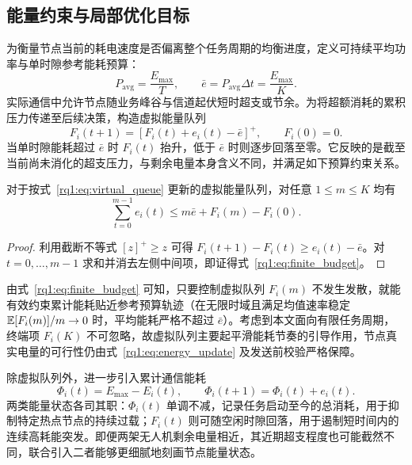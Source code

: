 \subsection{能量约束与局部优化目标}
\label{rq1:sec:lyapunov}

为衡量节点当前的耗电速度是否偏离整个任务周期的均衡进度，定义可持续平均功率与单时隙参考能耗预算：
\begin{equation}
 P_{\mathrm{avg}}=\frac{E_{\max}}{T},\qquad
 \bar e=P_{\mathrm{avg}}\Delta t=\frac{E_{\max}}{K}.
 \label{rq1:eq:average_budget}
\end{equation}
实际通信中允许节点随业务峰谷与信道起伏短时超支或节余。为将超额消耗的累积压力传递至后续决策，构造虚拟能量队列
\begin{equation}
 F_i(t+1)=[F_i(t)+e_i(t)-\bar e]^+,\qquad F_i(0)=0.
 \label{rq1:eq:virtual_queue}
\end{equation}
当单时隙能耗超过 $\bar e$ 时 $F_i(t)$ 抬升，低于 $\bar e$ 时则逐步回落至零。它反映的是截至当前尚未消化的超支压力，与剩余电量本身含义不同，并满足如下预算约束关系。

\begin{proposition}[虚拟队列的累计预算关系]
\label{rq1:prop:budget}
对于按式~\eqref{rq1:eq:virtual_queue} 更新的虚拟能量队列，对任意 $1\le m\le K$ 均有
\begin{equation}
 \sum_{t=0}^{m-1}e_i(t)\le m\bar e+F_i(m)-F_i(0).
 \label{rq1:eq:finite_budget}
\end{equation}
\end{proposition}
\begin{proof}
利用截断不等式 $[z]^+\ge z$ 可得 $F_i(t+1)-F_i(t)\ge e_i(t)-\bar e$。对 $t=0,\ldots,m-1$ 求和并消去左侧中间项，即证得式~\eqref{rq1:eq:finite_budget}。
\end{proof}

由式~\eqref{rq1:eq:finite_budget} 可知，只要控制虚拟队列 $F_i(m)$ 不发生发散，就能有效约束累计能耗贴近参考预算轨迹（在无限时域且满足均值速率稳定 $\mathbb{E}[F_i(m)]/m\to0$ 时，平均能耗严格不超过 $\bar e$）。考虑到本文面向有限任务周期，终端项 $F_i(K)$ 不可忽略，故虚拟队列主要起平滑能耗节奏的引导作用，节点真实电量的可行性仍由式~\eqref{rq1:eq:energy_update} 及发送前校验严格保障。

除虚拟队列外，进一步引入累计通信能耗
\begin{equation}
 \Phi_i(t)=E_{\max}-E_i(t),\qquad
 \Phi_i(t+1)=\Phi_i(t)+e_i(t).
 \label{rq1:eq:energy_deficit}
\end{equation}
两类能量状态各司其职：$\Phi_i(t)$ 单调不减，记录任务启动至今的总消耗，用于抑制特定热点节点的持续过载；$F_i(t)$ 则可随空闲时隙回落，用于遏制短时间内的连续高耗能突发。即便两架无人机剩余电量相近，其近期超支程度也可能截然不同，联合引入二者能够更细腻地刻画节点能量状态。

